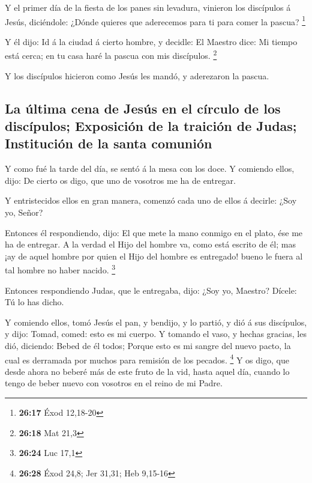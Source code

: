  Y el primer día de la fiesta de los panes sin levadura,
vinieron los discípulos á Jesús, diciéndole: ¿Dónde quieres que
aderecemos para ti para comer la pascua? \footnote{\textbf{26:17} Éxod
  12,18-20}

 Y él dijo: Id á la ciudad á cierto hombre, y decidle: El
Maestro dice: Mi tiempo está cerca; en tu casa haré la pascua con mis
discípulos. \footnote{\textbf{26:18} Mat 21,3}

 Y los discípulos hicieron como Jesús les mandó, y
aderezaron la pascua.

\hypertarget{la-uxfaltima-cena-de-jesuxfas-en-el-cuxedrculo-de-los-discuxedpulos-exposiciuxf3n-de-la-traiciuxf3n-de-judas-instituciuxf3n-de-la-santa-comuniuxf3n}{%
\subsection{La última cena de Jesús en el círculo de los discípulos;
Exposición de la traición de Judas; Institución de la santa
comunión}\label{la-uxfaltima-cena-de-jesuxfas-en-el-cuxedrculo-de-los-discuxedpulos-exposiciuxf3n-de-la-traiciuxf3n-de-judas-instituciuxf3n-de-la-santa-comuniuxf3n}}

 Y como fué la tarde del día, se sentó á la mesa con los
doce.  Y comiendo ellos, dijo: De cierto os digo, que uno
de vosotros me ha de entregar.

 Y entristecidos ellos en gran manera, comenzó cada uno de
ellos á decirle: ¿Soy yo, Señor?

 Entonces él respondiendo, dijo: El que mete la mano
conmigo en el plato, ése me ha de entregar.  A la verdad el
Hijo del hombre va, como está escrito de él; mas ¡ay de aquel hombre por
quien el Hijo del hombre es entregado! bueno le fuera al tal hombre no
haber nacido. \footnote{\textbf{26:24} Luc 17,1}

 Entonces respondiendo Judas, que le entregaba, dijo: ¿Soy
yo, Maestro? Dícele: Tú lo has dicho.

 Y comiendo ellos, tomó Jesús el pan, y bendijo, y lo
partió, y dió á sus discípulos, y dijo: Tomad, comed: esto es mi cuerpo.
 Y tomando el vaso, y hechas gracias, les dió, diciendo:
Bebed de él todos;  Porque esto es mi sangre del nuevo
pacto, la cual es derramada por muchos para remisión de los pecados.
\footnote{\textbf{26:28} Éxod 24,8; Jer 31,31; Heb 9,15-16}
 Y os digo, que desde ahora no beberé más de este fruto de
la vid, hasta aquel día, cuando lo tengo de beber nuevo con vosotros en
el reino de mi Padre.

